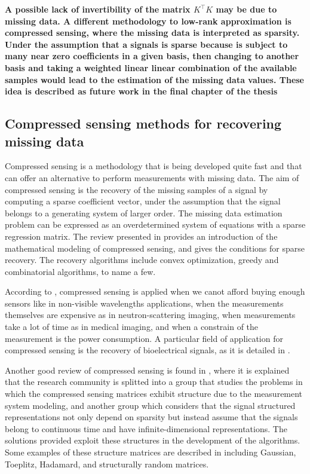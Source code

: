 \documentclass[11pt]{article}
\begin{document}
\begin{itemize}
	{\bfseries A possible lack of invertibility of the matrix $K^\top K$ may be due to missing data. A different methodology to low-rank approximation is compressed sensing, where the missing data is interpreted as sparsity. Under the assumption that a signals is sparse because is subject to many near zero coefficients in a given basis, then changing to another basis and taking a weighted linear linear combination of the available samples would lead to the estimation of the missing data values. These idea is described as future work in the final chapter of the thesis  }
	
	\color{blue}
	
	\subsection*{Compressed sensing methods for recovering missing data}
	
	Compressed sensing is a methodology that is being developed quite fast and that can offer an alternative to perform measurements with missing data. 
	The aim of compressed sensing is the recovery of the missing samples of a signal by computing a sparse coefficient vector, under the assumption that the signal belongs to a generating system of larger order. 
	The missing data estimation problem can be expressed as an overdetermined system of equations with a sparse regression matrix. 
	The review presented in \cite{Eldar2012compressed} provides an introduction of the mathematical modeling of compressed sensing, and gives the conditions for sparse recovery. 
	The recovery algorithms include convex optimization, greedy and combinatorial algorithms, to name a few.
    
    According to \cite{Rani18}, compressed sensing is applied when we canot afford buying enough sensors like in non-visible wavelengths applications, when the measurements themselves are expensive as in neutron-scattering imaging, when measurements take a lot of time as in medical imaging, and when a constrain of the measurement is the power consumption.
    A particular field of application for compressed sensing is the recovery of bioelectrical signals, as it is detailed in \cite{Craven15}.
	 
    Another good review of compressed sensing is found in \cite{Duarte11}, where it is explained that the  research community is splitted into a group that studies the problems in which the compressed sensing matrices exhibit structure due to the measurement system modeling, and another group which considers that the signal structured representations not only depend on sparsity but instead assume that the signals belong to continuous time and have infinite-dimensional representations. The solutions provided exploit these structures in the development of the algorithms. Some examples of these structure matrices are described in \cite{Kezhi15} including Gaussian, Toeplitz, Hadamard, and structurally random matrices.
	 

\end{itemize}
\end{document}
